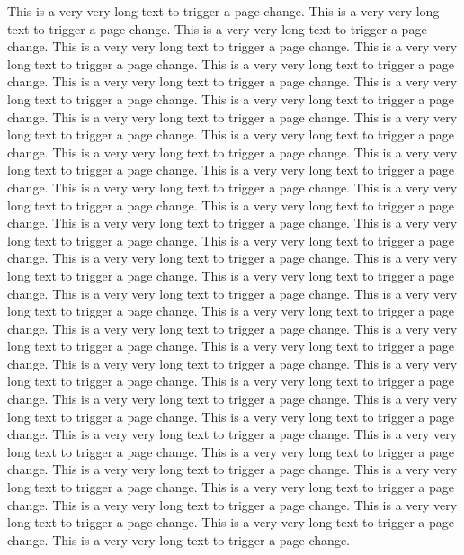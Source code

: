 \documentclass{article}
\begin{document}
\begin{mdframed}
 This is a very very long text to trigger a page change. This is a very very long text to trigger a page change.
 This is a very very long text to trigger a page change. This is a very very long text to trigger a page change.
 This is a very very long text to trigger a page change. This is a very very long text to trigger a page change.
 This is a very very long text to trigger a page change. This is a very very long text to trigger a page change.
 This is a very very long text to trigger a page change. This is a very very long text to trigger a page change.
 This is a very very long text to trigger a page change. This is a very very long text to trigger a page change.
 This is a very very long text to trigger a page change. This is a very very long text to trigger a page change.
 This is a very very long text to trigger a page change. This is a very very long text to trigger a page change.
 This is a very very long text to trigger a page change. This is a very very long text to trigger a page change.
 This is a very very long text to trigger a page change. This is a very very long text to trigger a page change.
 This is a very very long text to trigger a page change. This is a very very long text to trigger a page change.
 This is a very very long text to trigger a page change. This is a very very long text to trigger a page change.
 This is a very very long text to trigger a page change. This is a very very long text to trigger a page change.
 This is a very very long text to trigger a page change. This is a very very long text to trigger a page change.
 This is a very very long text to trigger a page change. This is a very very long text to trigger a page change.
 This is a very very long text to trigger a page change. This is a very very long text to trigger a page change.
 This is a very very long text to trigger a page change. This is a very very long text to trigger a page change.
 This is a very very long text to trigger a page change. This is a very very long text to trigger a page change.
 This is a very very long text to trigger a page change. This is a very very long text to trigger a page change.
 This is a very very long text to trigger a page change. This is a very very long text to trigger a page change.
 This is a very very long text to trigger a page change. This is a very very long text to trigger a page change.
 This is a very very long text to trigger a page change. This is a very very long text to trigger a page change.
 This is a very very long text to trigger a page change. This is a very very long text to trigger a page change.

\end{mdframed}
\end{document}
